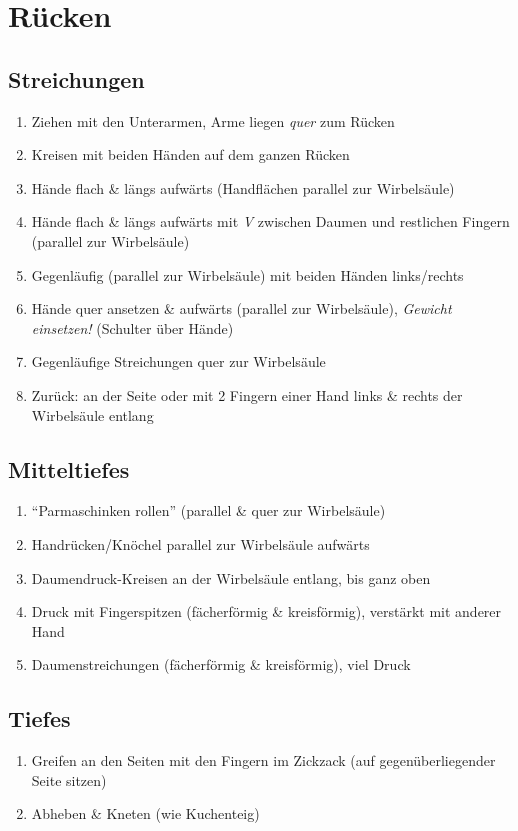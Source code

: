 \section{Rücken}

\subsection{Streichungen}
\begin{enumerate}
\item Ziehen mit den Unterarmen, Arme liegen \emph{quer} zum Rücken
\item Kreisen mit beiden Händen auf dem ganzen Rücken
\item Hände flach \& längs aufwärts (Handflächen parallel zur Wirbelsäule)
\item Hände flach \& längs aufwärts mit \emph{V} zwischen Daumen und restlichen Fingern (parallel zur Wirbelsäule)
\item Gegenläufig (parallel zur Wirbelsäule) mit beiden Händen links/rechts
\item Hände quer ansetzen \& aufwärts (parallel zur Wirbelsäule), \emph{Gewicht einsetzen!} (Schulter über Hände)
\item Gegenläufige Streichungen quer zur Wirbelsäule
\item Zurück: an der Seite oder mit 2 Fingern einer Hand links \& rechts der Wirbelsäule entlang
\end{enumerate}

\subsection{Mitteltiefes}
\begin{enumerate}
\item "`Parmaschinken rollen"' (parallel \& quer zur Wirbelsäule)
\item Handrücken/Knöchel parallel zur Wirbelsäule aufwärts
\item Daumendruck-Kreisen an der Wirbelsäule entlang, bis ganz oben
\item Druck mit Fingerspitzen (fächerförmig \& kreisförmig), verstärkt mit anderer Hand
\item Daumenstreichungen (fächerförmig \& kreisförmig), viel Druck
\end{enumerate}

\subsection{Tiefes}
\begin{enumerate}
\item Greifen an den Seiten mit den Fingern im Zickzack (auf gegenüberliegender Seite sitzen)
\item Abheben \& Kneten (wie Kuchenteig)
\end{enumerate}

